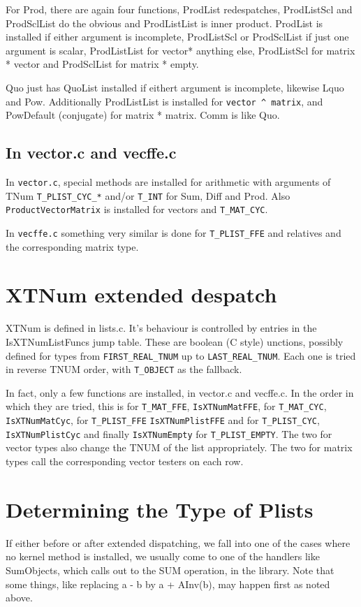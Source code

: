 \documentclass{article}
\begin{document}
For Prod, there are again four functions, ProdList redespatches,
ProdListScl and ProdSclList do the obvious and ProdListList is inner
product. ProdList is installed if either argument is incomplete,
ProdListScl or ProdSclList if just one argument is scalar,
ProdListList for vector* anything else, ProdListScl
for matrix * vector and ProdSclList for matrix * empty. 

Quo just has QuoList installed if eithert argument is incomplete,
likewise Lquo and Pow. Additionally ProdListList is installed for
\verb|vector ^ matrix|, and PowDefault (conjugate) for matrix * matrix. Comm
is like Quo.

\subsection{In vector.c and vecffe.c}

In \verb|vector.c|, special methods are installed for arithmetic with
arguments of TNum \verb|T_PLIST_CYC_*| and/or \verb|T_INT| for Sum, Diff and
Prod. Also \verb|ProductVectorMatrix| is installed for vectors and
\verb|T_MAT_CYC|.

In \verb|vecffe.c| something very similar is done for
\verb|T_PLIST_FFE| and relatives and the corresponding matrix type.



\section{XTNum extended despatch}

XTNum is defined in lists.c. It's behaviour is controlled by entries
in the IsXTNumListFuncs jump table. These are boolean (C style)
unctions, possibly defined for types from \verb|FIRST_REAL_TNUM| up to
\verb|LAST_REAL_TNUM|. Each one is tried in reverse TNUM order, with
\verb|T_OBJECT| as the fallback.

In fact, only a few functions are installed, in vector.c and
vecffe.c. In the order in which they are tried, this is for \verb|T_MAT_FFE|,
\verb|IsXTNumMatFFE|, for \verb|T_MAT_CYC|, \verb|IsXTNumMatCyc|, for \verb|T_PLIST_FFE|
\verb|IsXTNumPlistFFE| and for \verb|T_PLIST_CYC|, \verb|IsXTNumPlistCyc| and finally
\verb|IsXTNumEmpty| for \verb|T_PLIST_EMPTY|. The two for vector types also change
the TNUM of the list appropriately. The two for matrix types call the
corresponding vector testers on each row.

\section{Determining the Type of Plists}
If either before or after extended dispatching, we fall into one of
the cases where no kernel method is installed, we usually come to one
of the handlers like SumObjects, which calls out to the SUM operation,
in the library. Note that some things, like replacing a - b by a +
AInv(b), may happen first as noted above.
\end{document}
